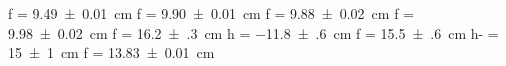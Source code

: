 f = \SI{+9.49(1)}{\centi\meter}
f = \SI{+9.90(1)}{\centi\meter}
f = \SI{+9.88(2)}{\centi\meter}
f = \SI{+9.98(2)}{\centi\meter}
f = \SI{+16.2(3)}{\centi\meter}
h = \SI{-11.8(6)}{\centi\meter}
f = \SI{+15.5(6)}{\centi\meter}
h- = \SI{+15(1)}{\centi\meter}
f = \SI{+13.83(1)}{\centi\meter}
